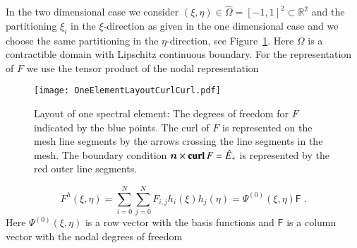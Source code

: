 \documentclass[graybox]{svmult}
\begin{document}
In the two dimensional case we consider $(\xi,\eta) \in \hat{\Omega} = [-1,1]^2\subset \mathbb{R}^2$ and the partitioning $\xi_i$ in the $\xi$-direction as given in the one dimensional case and we choose the same partitioning in the $\eta$-direction, see Figure~\ref{fig:F_grid}. Here $\Omega$ is a contractible domain with Lipschitz continuous boundary. For the representation of $F$ we use the tensor product of the nodal representation
\begin{center}
\begin{figure}[h!]
\texttt{[image: OneElementLayoutCurlCurl.pdf]}
%
%
\caption{Layout of one spectral element: The degrees of freedom for $F$ indicated by the blue points. The curl of $F$ is represented on the mesh line segments by the arrows crossing the line segments in the mesh. The boundary condition $\bm{n}\times \mbox{\bf{curl}}\,F=\hat{E}_{\dashv}$ is represented by the red outer line segments.}
\label{fig:F_grid}       %
\end{figure}
\end{center}
\begin{equation}
F^h(\xi,\eta) = \sum_{i=0}^N \sum_{j=0}^N F_{i,j}h_i(\xi)h_j(\eta) = \Psi^{(0)}(\xi,\eta) \mathsf{F} \;.
\label{eq:F_expansion}
\end{equation}
Here $\Psi^{(0)}(\xi,\eta)$ is a row vector with the basis functions and $\mathsf{F}$ is a column vector with the nodal degrees of freedom
\end{document}
